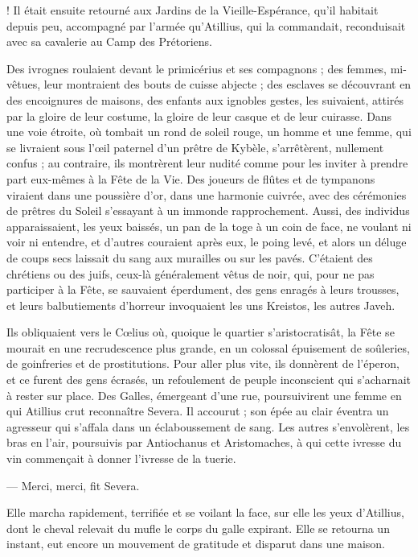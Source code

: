 \documentclass[a4paper, 11pt, oneside, polutonikogreek, french]{article}
\begin{document}
! Il était ensuite retourné aux Jardins de la Vieille-Espérance, qu'il habitait depuis peu, accompagné par l'armée qu'Atillius, qui la commandait, reconduisait avec sa cavalerie au Camp des Prétoriens.

Des ivrognes roulaient devant le primicérius et ses compagnons ; des femmes, mi-vêtues, leur montraient des bouts de cuisse abjecte ; des esclaves se découvrant en des encoignures de maisons, des enfants aux ignobles gestes, les suivaient, attirés par la gloire de leur costume, la gloire de leur casque et de leur cuirasse. Dans une voie étroite, où tombait un rond de soleil rouge, un homme et une femme, qui se livraient sous l'œil paternel d'un prêtre de Kybèle, s'arrêtèrent, nullement confus ; au contraire, ils montrèrent leur nudité comme pour les inviter à prendre part eux-mêmes à la Fête de la Vie. Des joueurs de flûtes et de tympanons viraient dans une poussière d'or, dans une harmonie cuivrée, avec des cérémonies de prêtres du Soleil s'essayant à un immonde rapprochement. Aussi, des individus apparaissaient, les yeux baissés, un pan de la toge à un coin de face, ne voulant ni voir ni entendre, et d'autres couraient après eux, le poing levé, et alors un déluge de coups secs laissait du sang aux murailles ou sur les pavés. C'étaient des chrétiens ou des juifs, ceux-là généralement vêtus de noir, qui, pour ne pas participer à la Fête, se sauvaient éperdument, des gens enragés à leurs trousses, et leurs balbutiements d'horreur invoquaient les uns Kreistos, les autres Javeh.

Ils obliquaient vers le Cœlius où, quoique le quartier s'aristocratisât, la Fête se mourait en une recrudescence plus grande, en un colossal épuisement de soûleries, de goinfreries et de prostitutions. Pour aller plus vite, ils donnèrent de l'éperon, et ce furent des gens écrasés, un refoulement de peuple inconscient qui s'acharnait à rester sur place. Des Galles, émergeant d'une rue, poursuivirent une femme en qui Atillius crut reconnaître Severa. Il accourut ; son épée au clair éventra un agresseur qui s'affala dans un éclaboussement de sang. Les autres s'envolèrent, les bras en l'air, poursuivis par Antiochanus et Aristomaches, à qui cette ivresse du vin commençait à donner l'ivresse de la tuerie.

--- Merci, merci, fit Severa.

Elle marcha rapidement, terrifiée et se voilant la face, sur elle les yeux d'Atillius, dont le cheval relevait du mufle le corps du galle expirant. Elle se retourna un instant, eut encore un mouvement de gratitude et disparut dans une maison.
\end{document}
